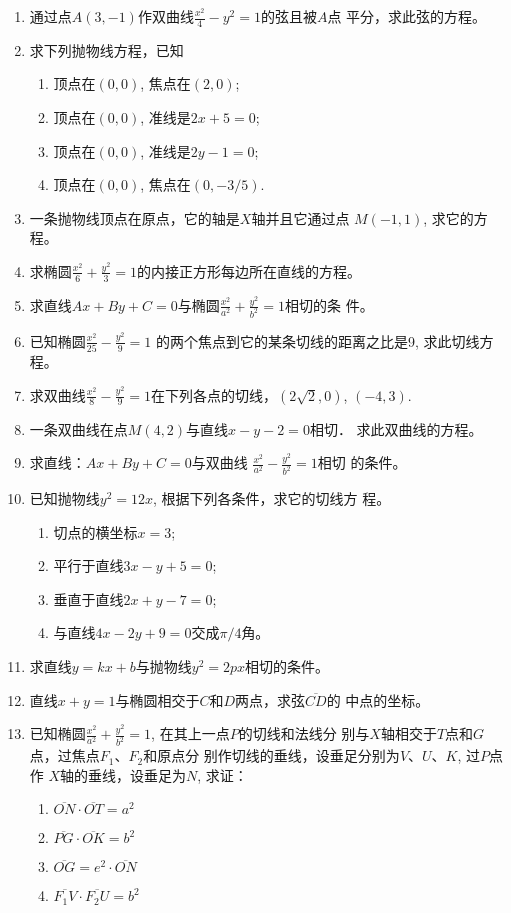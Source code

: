 \begin{enumerate}
\item 通过点$A(3,-1)$作双曲线$\frac{x^2}{4}-y^2=1$的弦且被$A$点
平分，求此弦的方程。
\item 求下列抛物线方程，已知
\begin{enumerate}
    \item 顶点在$(0,0)$, 焦点在$(2,0)$;
    \item 顶点在$(0,0)$, 准线是$2x+5=0$;
    \item 顶点在$(0,0)$, 准线是$2y-1=0$;
    \item 顶点在$(0,0)$, 焦点在$(0,-3/5)$.
\end{enumerate}

\item 一条抛物线顶点在原点，它的轴是$X$轴并且它通过点
$M(-1,1)$, 求它的方程。

\item 求椭圆$\frac{x^2}{6}+\frac{y^2}{3}=1$的内接正方形每边所在直线的方程。
\item 求直线$Ax+By+C=0$与椭圆$\frac{x^2}{a^2}+\frac{y^2}{b^2}=1$相切的条
件。

\item 已知椭圆$\frac{x^2}{25}-\frac{y^2}{9}=1$
的两个焦点到它的某条切线的距离之比是9, 求此切线方程。
\item 求双曲线$\frac{x^2}{8}-\frac{y^2}{9}=1$在下列各点的切线，$(2\sqrt{2},0)$, $(-4,3)$.
\item 一条双曲线在点$M(4,2)$与直线$x-y-2=0$相切．
求此双曲线的方程。
\item 求直线：$Ax+By+C=0$与双曲线
$\frac{x^2}{a^2}-\frac{y^2}{b^2}=1$相切
的条件。
\item 已知抛物线$y^2=12x$, 根据下列各条件，求它的切线方
程。
\begin{enumerate}
\item 切点的横坐标$x=3$;
\item 平行于直线$3x-y+5=0$;
\item 垂直于直线$2x+y-7=0$;
\item 与直线$4x-2y+9=0$交成$\pi/4$角。
\end{enumerate}

\item 求直线$y=kx+b$与抛物线$y^2=2px$相切的条件。
\item 直线$x+y=1$与椭圆相交于$C$和$D$两点，求弦$\overline{CD}$的
中点的坐标。
\item 已知椭圆$\frac{x^2}{a^2}+\frac{y^2}{b^2}=1$, 在其上一点$P$的切线和法线分
别与$X$轴相交于$T$点和$G$点，过焦点$F_1$、$F_2$和原点分
别作切线的垂线，设垂足分别为$V$、$U$、$K$, 过$P$点作
$X$轴的垂线，设垂足为$N$, 求证：
\begin{enumerate}
    \item $\overline{ON}\cdot \overline{OT}=a^2$
    \item $\overline{PG}\cdot \overline{OK}=b^2$
    \item $\overline{OG}=e^2\cdot \overline{ON}$
    \item $\overline{F_1V}\cdot  \overline{F_2U}=b^2$
\end{enumerate}
\end{enumerate}



